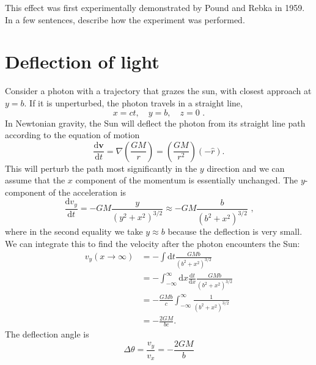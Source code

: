 \documentclass[12pt]{article}
\newcommand\diff{\mathrm{d}}
\begin{document}
This effect was first experimentally demonstrated by Pound and Rebka in 1959. In
a few sentences, describe how the experiment was performed.

\section{Deflection of light}

Consider a photon with a trajectory that grazes the sun, with closest approach
at $y = b$. If it is unperturbed, the photon travels in a straight line,
\begin{equation}
    x = ct, \quad y = b, \quad z = 0 \text{ .}
\end{equation}
In Newtonian gravity, the Sun will deflect the photon from its straight line
path according to the equation of motion
\begin{equation}
    \frac{\diff\mathbf{v}}{\diff t} = \nabla\left(\frac{GM}{r}\right)
    = \left(\frac{GM}{r^2}\right) \left(- \hat{r}\right) \text{.}
\end{equation}
This will perturb the path most significantly in the $y$ direction and we can
assume that the $x$ component of the momentum is essentially unchanged. The
$y$-component of the acceleration is
\begin{equation}
    \frac{\diff v_y}{\diff t} = - G M \frac{y}{\left(y^2 + x^2\right)^{3/2}}
    \approx - G M \frac{b}{\left(b^2 + x^2\right)^{3/2}} \text{ ,}
\end{equation}
where in the second equality we take $y \approx b$ because the deflection is
very small. We can integrate this to find the velocity after the photon
encounters the Sun:
\begin{equation}
\begin{split}
    v_y(x \rightarrow \infty)
    &= - \int \diff t \frac{G M b}{\left(b^2 + x^2\right)^{3/2}}\\
    &= - \int_{-\infty}^\infty \diff x \frac{\diff t}{\diff x}
        \frac{G M b}{\left(b^2 + x^2\right)^{3/2}}\\
    &= - \frac{G M b}{c} \int_{-\infty}^\infty
        \frac{1}{\left(b^2 + x^2\right)^{3/2}}\\
    &= - \frac{2 G M}{b c} \text{.}
\end{split}
\end{equation}
The deflection angle is
\begin{equation}
    \Delta \theta = \frac{v_y}{v_x} = - \frac{2 G M}{b}
\end{equation}
\end{document}

